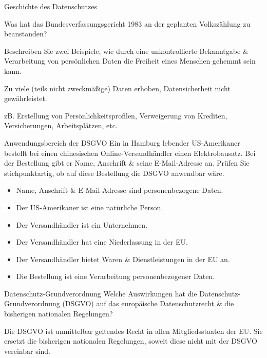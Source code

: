 \documentclass{exercisesheet}
\author{Leopold Lemmermann}
\begin{document}
\createtitle

\begin{exercises}{Geschichte des Datenschutzes}
\item Was hat das Bundesverfassungsgericht 1983 an der geplanten Volkszählung zu beanstanden?
\item Beschreiben Sie zwei Beispiele, wie durch eine unkontrollierte Bekanntgabe \& Verarbeitung von persönlichen Daten die Freiheit eines Menschen gehemmt sein kann.
\end{exercises}

\begin{solutions}
  \item Zu viele (teils nicht zweckmäßige) Daten erhoben, Datensicherheit nicht gewährleistet.
  \item zB. Erstellung von Persönlichkeitsprofilen, Verweigerung von Krediten, Versicherungen, Arbeitsplätzen, etc.
\end{solutions}

\begin{exercise}{Anwendungsbereich der DSGVO}
  Ein in Hamburg lebender US-Amerikaner bestellt bei einen chinesischen Online-Versandhändler einen Elektrobausatz. Bei der Bestellung gibt er Name, Anschrift \& seine E-Mail-Adresse an. Prüfen Sie stichpunktartig, ob auf diese Bestellung die DSGVO anwendbar wäre.

  \begin{solution}
    \begin{itemize}
      \item Name, Anschrift \& E-Mail-Adresse sind personenbezogene Daten. \checkmark
      \item Der US-Amerikaner ist eine natürliche Person. \checkmark
      \item Der Versandhändler ist ein Unternehmen. \checkmark
      \item Der Versandhändler hat eine Niederlassung in der EU. \xmark
      \item Der Versandhändler bietet Waren \& Dienstleistungen in der EU an. \checkmark
      \item Die Bestellung ist eine Verarbeitung personenbezogener Daten. \checkmark
    \end{itemize}
  \end{solution}
\end{exercise}

\begin{exercise}{Datenschutz-Grundverordnung}
  Welche Auswirkungen hat die Datenschutz-Grundverordnung (DSGVO) auf das europäische Datenschutzrecht \& die bisherigen nationalen Regelungen?

  \begin{solution}
    Die DSGVO ist unmittelbar geltendes Recht in allen Mitgliedsstaaten der EU. Sie ersetzt die bisherigen nationalen Regelungen, soweit diese nicht mit der DSGVO vereinbar sind.
  \end{solution}
\end{exercise}
\end{document}
